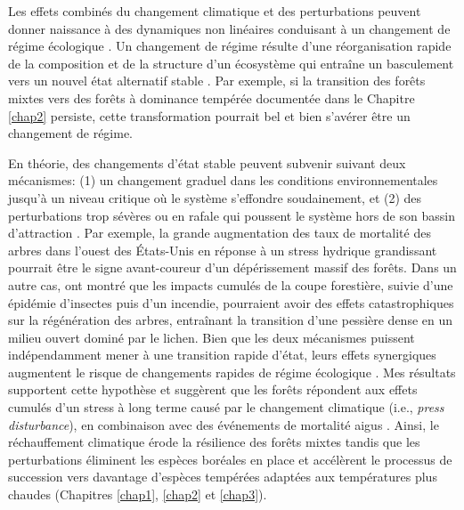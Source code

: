 Les effets combinés du changement climatique et des perturbations
peuvent donner naissance à des dynamiques non linéaires conduisant à un
changement de régime écologique \citep[\emph{regime shift}; Fig.
\ref{fig4.2};][]{harris_biological_2018, scheffer_catastrophic_2001}. Un
changement de régime résulte d'une réorganisation rapide de la
composition et de la structure d'un écosystème qui entraîne un
basculement vers un nouvel état alternatif stable
\citep{scheffer_catastrophic_2001}. Par exemple, si la transition des
forêts mixtes vers des forêts à dominance tempérée documentée dans le
Chapitre \ref{chap2} persiste, cette transformation pourrait bel et bien
s'avérer être un changement de régime.

En théorie, des changements d'état stable peuvent subvenir suivant deux
mécanismes: (1) un changement graduel dans les conditions
environnementales jusqu'à un niveau critique où le système s'effondre
soudainement, et (2) des perturbations trop sévères ou en rafale qui
poussent le système hors de son bassin d'attraction
\citep{scheffer_catastrophic_2001}. Par exemple, la grande augmentation
des taux de mortalité des arbres dans l'ouest des États-Unis en réponse
à un stress hydrique grandissant \citep{van_mantgem_apparent_2007}
pourrait être le signe avant-coureur d'un dépérissement massif des
forêts. Dans un autre cas, \citet{payette_shift_2003} ont montré que les
impacts cumulés de la coupe forestière, suivie d'une épidémie d'insectes
puis d'un incendie, pourraient avoir des effets catastrophiques sur la
régénération des arbres, entraînant la transition d'une pessière dense
en un milieu ouvert dominé par le lichen. Bien que les deux mécanismes
puissent indépendamment mener à une transition rapide d'état, leurs
effets synergiques augmentent le risque de changements rapides de régime
écologique \citep{harris_biological_2018, scheffer_catastrophic_2001}.
Mes résultats supportent cette hypothèse et suggèrent que les forêts
répondent aux effets cumulés d'un stress à long terme causé par le
changement climatique (i.e., \emph{press disturbance}), en combinaison
avec des événements de mortalité aigus \citep[i.e., \emph{pulse
disturbance};][]{jentsch_theory_2019, harris_biological_2018}. Ainsi, le
réchauffement climatique érode la résilience des forêts mixtes tandis
que les perturbations éliminent les espèces boréales en place et
accélèrent le processus de succession vers davantage d'espèces tempérées
adaptées aux températures plus chaudes (Chapitres \ref{chap1},
\ref{chap2} et \ref{chap3}).

